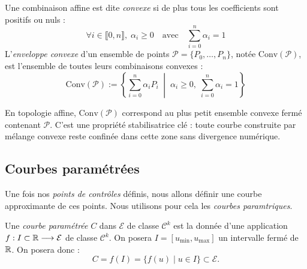 \begin{definition}
    Une combinaison affine est dite \emph{convexe} si de plus tous les coefficients sont positifs ou nuls :
    \begin{equation}
        \forall i \in \llbracket 0, n \rrbracket, \; \alpha_i \geqslant 0 \quad \text{avec} \quad \sum_{i=0}^n \alpha_i = 1
    \end{equation}
    L'\emph{enveloppe convexe} d'un ensemble de points $\mathcal{P} = \{P_0, \dots, P_n\}$, notée $\mathrm{Conv}(\mathcal{P})$, est l'ensemble de toutes leurs combinaisons convexes :
    \begin{equation}
        \boxed{\mathrm{Conv}(\mathcal{P}) := \left\{ \sum_{i=0}^n \alpha_i P_i \;\middle|\; \alpha_i \geqslant 0, \; \sum_{i=0}^n \alpha_i = 1 \right\}}
    \end{equation}
\end{definition}

En topologie affine, $\mathrm{Conv}(\mathcal{P})$ correspond au plus petit ensemble convexe fermé contenant $\mathcal{P}$. C'est une propriété stabilisatrice clé : toute courbe construite par mélange convexe reste confinée dans cette zone sans divergence numérique.

\subsection{Courbes paramétrées}

Une fois nos \emph{points de contrôles} définis, nous allons définir une courbe approximante de ces points. Nous utilisons pour cela les \emph{courbes paramtriques}. 

\begin{definition}
    Une \emph{courbe paramétrée} $C$ dans $\mathcal{E}$ de classe $ \mathcal{C}^k$ est la donnée d'une application $f : I \subset \mathbb{R} \longrightarrow \mathcal{E}$ de classe $ \mathcal{C}^k$. 
    On posera $I = [u_{\min}, u_{\max}]$ un intervalle fermé de $\mathbb{R}$. On posera donc : 
    \begin{equation}
        C = f(I) = \{f(u) \mid u \in I\} \subset \mathcal{E}. 
    \end{equation}
\end{definition}


